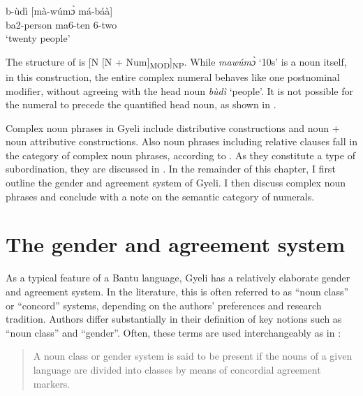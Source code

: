 \ea\label{NPNum}
\ea \label{NPNum1}
  \gll     b-ùdì [mà-wúmɔ̀ má-báà] \\
                ba2-person {\db}ma6-ten 6-two \\
    \trans `twenty people'
\z
\z

\noindent The structure of  is [N $[$N + Num$]$\textsubscript{MOD}]\textsubscript{NP}. While {\itshape mawúmɔ̀} `10s' is a noun itself, in this construction, the entire complex numeral behaves like one postnominal modifier, without agreeing with the head noun {\itshape bùdì} `people'.  It is not possible for the numeral {\NP} to precede the quantified head noun, as shown in . 


Complex noun phrases in Gyeli include distributive constructions and noun + noun attributive constructions. Also noun phrases including relative clauses fall in the category of complex noun phrases, according to \citet{dryer2007}. As they constitute a type of subordination, they are discussed in .   In the remainder of this chapter, I first outline the gender and agreement system of Gyeli. I then discuss complex noun phrases and conclude with a note on the semantic category of numerals. 









\section{The gender and agreement system}
\label{sec:Gender}

As a typical feature of a Bantu language, Gyeli has a relatively elaborate gender and agreement system. In the literature, this is often referred to as ``noun class'' or ``concord'' systems, depending on the authors' preferences and research tradition. Authors differ substantially in their definition of key notions such as ``noun class'' and ``gender''. Often, these terms are used interchangeably as in \citet[190]{heine82}:
\begin{quote}
A noun class or gender system is said to be present if the nouns of a given language are divided into classes by means of concordial agreement markers.
\end{quote}

